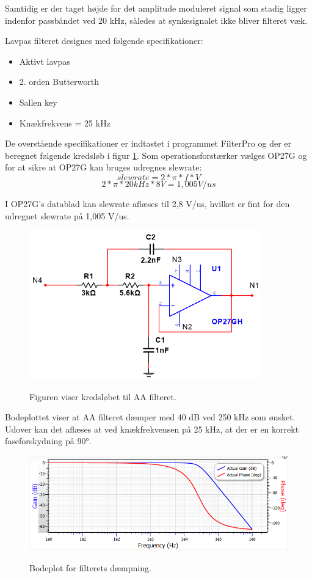 Samtidig er der taget højde for det amplitude moduleret signal som stadig ligger indenfor passbåndet ved 20 kHz, således at synkesignalet ikke bliver filteret væk.

Lavpas filteret designes med følgende specifikationer:
\begin{itemize}
\item Aktivt lavpas
\item 2. orden Butterworth 
\item Sallen key
\item Knækfrekvens = 25 kHz
\end{itemize}

De overstående specifikationer er indtastet i programmet FilterPro og der er beregnet følgende kredsløb i figur \ref{Fig:aafilterdiagram}. Som operationsforstærker vælges OP27G og for at sikre at OP27G kan bruges udregnes slewrate:
$$slewrate=2*\pi*f*V$$
$$2*\pi*20kHz*8V=1,005V/us$$

I OP27G's datablad kan slewrate aflæses til 2,8 V/us, hvilket er fint for den udregnet slewrate på 1,005 V/us. 

\begin{figure}[H]
\centering
{\includegraphics[width=10cm]
{Figure/aafilterdiagram}}
\caption{Figuren viser kredsløbet til AA filteret.}
\label{Fig:aafilterdiagram}
\end{figure} 

Bodeplottet viser at AA filteret dæmper med 40 dB ved 250 kHz som ønsket. Udover kan det aflæses at ved knækfrekvensen på 25 kHz, at der er en korrekt faseforskydning på \ang{90}.

\begin{figure}[H]
\centering
{\includegraphics[width=\linewidth]
{Figure/aafilterbode}}
\caption{Bodeplot for filterets dæmpning. }
\label{Fig:aafilterbode}
\end{figure} 



